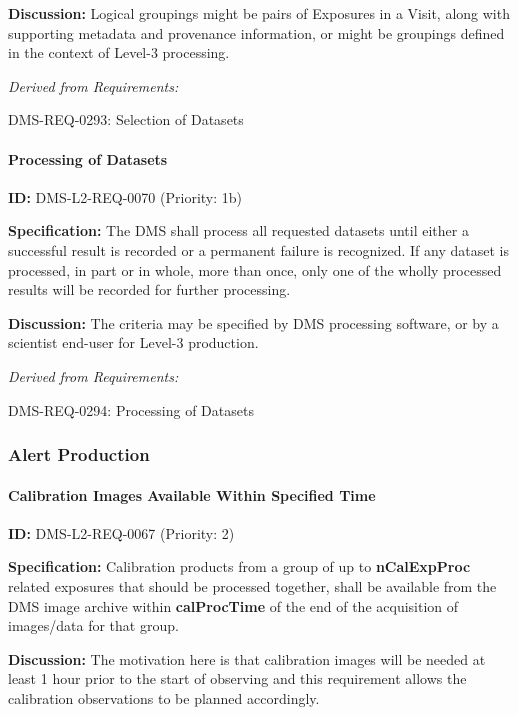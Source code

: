 \documentclass[SE,toc,lsstdraft]{lsstdoc}
\begin{document}
\textbf{Discussion: }Logical groupings might be pairs of Exposures in a Visit, along with supporting metadata and provenance information, or might be groupings defined in the context of Level-3 processing.

\emph{Derived from Requirements:}

DMS-REQ-0293:
Selection of Datasets \newline

\paragraph{Processing of Datasets}\hfill  %

\label{DMS-L2-REQ-0070}
\textbf{ID:} DMS-L2-REQ-0070 (Priority: 1b)

\textbf{Specification:} The DMS shall process all requested datasets until either a successful result is recorded or a permanent failure is recognized. If any dataset is processed, in part or in whole, more than once, only one of the wholly processed results will be recorded for further processing.

\textbf{Discussion: }The criteria may be specified by DMS processing software, or by a scientist end-user for Level-3 production.

\emph{Derived from Requirements:}

DMS-REQ-0294:
Processing of Datasets \newline

\subsubsection{Alert Production}

\paragraph{Calibration Images Available Within Specified Time}\hfill  %

\label{DMS-L2-REQ-0067}
\textbf{ID:} DMS-L2-REQ-0067 (Priority: 2)

\textbf{Specification:} Calibration products from a group of up to \textbf{nCalExpProc} related exposures that should be processed together, shall be available from the DMS image archive within \textbf{calProcTime} of the end of the acquisition of images/data for that group.

\textbf{Discussion: }The motivation here is that calibration images will be needed at least 1 hour prior to the start of observing and this requirement allows the calibration observations to be planned accordingly.
\end{document}
